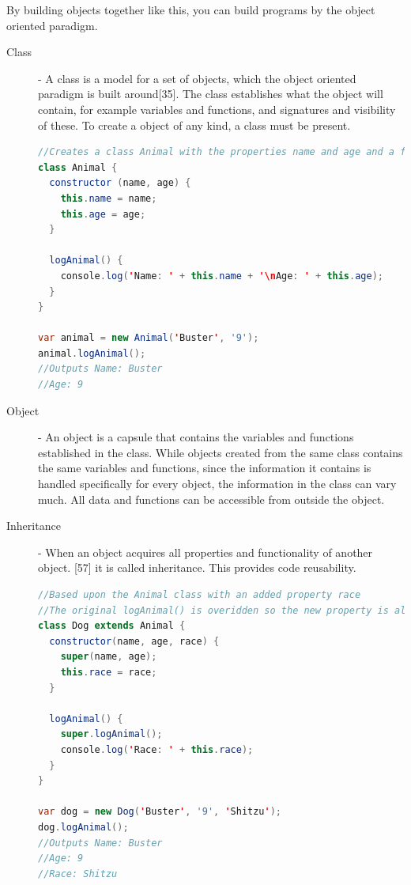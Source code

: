 \documentclass {article}
\begin{document}
By building objects together like this, you can build programs by the object oriented paradigm.  

\begin{description}
\item [Class] - A class is a model for a set of objects, which the object oriented paradigm is built around[35]. The class establishes what the object will contain, for example variables and functions, and signatures and visibility of these. To create a object of any kind, a class must be present. 

\begin{lstlisting}[language=Java]
//Creates a class Animal with the properties name and age and a function for logging the properties to the screen
class Animal {
  constructor (name, age) {
    this.name = name;
    this.age = age;
  }

  logAnimal() {
    console.log('Name: ' + this.name + '\nAge: ' + this.age);
  }
}

var animal = new Animal('Buster', '9');
animal.logAnimal();
//Outputs Name: Buster
//Age: 9
\end{lstlisting}

\item [Object] - An object is a capsule that contains the variables and functions established in the class. While objects created from the same class contains the same variables and functions, since the information it contains is handled specifically for every object, the information in the class can vary much. All data and functions can be accessible from outside the object. 

\item [Inheritance] - When an object acquires all properties and functionality of another object. [57] it is called inheritance. This provides code reusability. 

\begin{lstlisting}[language=Java, breaklines=true]
//Based upon the Animal class with an added property race
//The original logAnimal() is overidden so the new property is also logged to the screen.
class Dog extends Animal {
  constructor(name, age, race) {
    super(name, age);
    this.race = race;
  }

  logAnimal() {
    super.logAnimal();
    console.log('Race: ' + this.race);
  }
}

var dog = new Dog('Buster', '9', 'Shitzu');
dog.logAnimal();
//Outputs Name: Buster
//Age: 9
//Race: Shitzu
\end{lstlisting}


\end{description}
\end{document}
